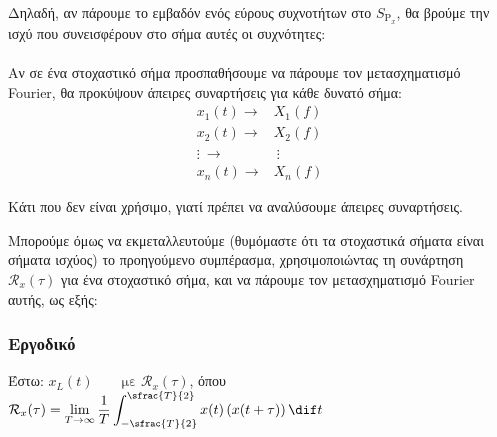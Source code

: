 \documentclass[11pt,a4paper,notitlepage,fleqn,final]{article}
\begin{document}
Δηλαδή, αν πάρουμε το εμβαδόν ενός εύρους συχνοτήτων στο
\(  S_{\mathrm P_{x}} \), θα βρούμε την ισχύ που συνεισφέρουν στο
σήμα αυτές οι συχνότητες:


\paragraph{}
Αν σε ένα στοχαστικό σήμα προσπαθήσουμε να πάρουμε τον μετασχηματισμό
Fourier, θα προκύψουν άπειρες συναρτήσεις για κάθε δυνατό σήμα:
\begin{align*}
	x_1(t) \xrightarrow{\quad} & X_1(f) \\
	x_2(t) \xrightarrow{\quad} & X_2(f) \\
	\vdots\ \xrightarrow{\quad} & \ \vdots \\
	x_n(t) \xrightarrow{\quad} & X_n(f)
\end{align*}

Κάτι που δεν είναι χρήσιμο, γιατί πρέπει να αναλύσουμε άπειρες
συναρτήσεις.

Μπορούμε όμως να εκμεταλλευτούμε (θυμόμαστε ότι τα στοχαστικά σήματα
είναι σήματα ισχύος) το προηγούμενο συμπέρασμα, χρησιμοποιώντας τη συνάρτηση \( \mathcal{R}_x(\tau) \) για ένα στοχαστικό σήμα,
και να πάρουμε τον μετασχηματισμό Fourier αυτής, ως εξής:

\subsubsection{Εργοδικό}
Έστω: \( x_L(t) \qquad \text{με } \mathcal{R}_x(\tau) \), όπου
\( \displaystyle \mathcal{R}_x(\tau)
= \lim_{T\to \infty} \frac{1}{T}
\int_{-\sfrac{T}{2} }^{\sfrac{T}{2} }x(t)\left(x(t+\tau)\right)\dif t
\)
\end{document}
